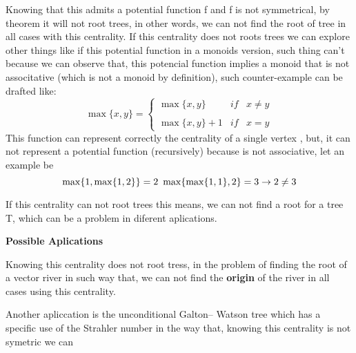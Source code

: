 Knowing that this admits a potential function f and f is not symmetrical, by theorem it will not root trees, in other words, we can not find the root of tree in all cases with this centrality. If this centrality does not roots trees we can explore other things like if this potential function in a monoids version, such thing can't because we can observe that, this potencial function implies a monoid that is not associtative (which is not a monoid by definition), such counter-example can be drafted like:
\begin{equation}
    \max\{ x,y \}= \left\{ \begin{array}{lcc}
              \max\{x,y \} &   if  & x \neq y \\
             \\ \max\{ x,y \} + 1 & if  & x = y 
             \end{array}
   \right.
\end{equation}
This function can represent correctly the centrality of a single vertex , but, it can not represent a potential function (recursively) because is not associative, let an example be
\begin{equation}
    \max\{ 1,\max\{ 1,2 \} \} = 2\
    \max\{ \max\{ 1,1 \},2 \}  = 3\\
    \rightarrow 2 \neq 3
\end{equation}

If this centrality can not root trees this means, we can not find a root for a tree T, which can be a problem in diferent aplications.

\vspace{1cm}

\textbf{Possible Aplications}

Knowing this centrality does not root tress, in the problem of finding the root of a vector river in such way that, we can not find the \textbf{origin} of the river in all cases using this centrality.

Another apliccation is the unconditional Galton–
Watson tree which has a specific use of the Strahler number in the way that, knowing this centrality is not symetric we can  

